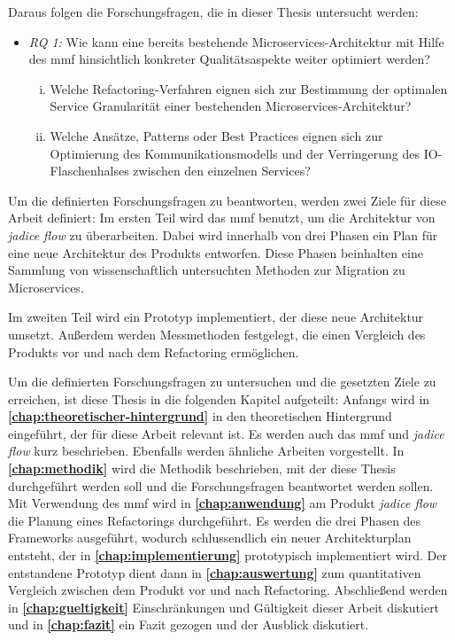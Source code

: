 Daraus folgen die Forschungsfragen, die in dieser Thesis untersucht werden:

\begin{itemize}
	\item \emph{RQ 1:} Wie kann eine bereits bestehende Microservices-Architektur mit Hilfe des \acrfull{mmf} hinsichtlich konkreter Qualitätsaspekte weiter optimiert werden?
	\begin{enumerate}[i.]
		\item Welche Refactoring-Verfahren eignen sich zur Bestimmung der optimalen Service Granularität einer bestehenden Microservices-Architektur?
		\item Welche Ansätze, Patterns oder Best Practices eignen sich zur Optimierung des Kommunikationsmodells und der Verringerung des IO-Flaschenhalses zwischen den einzelnen Services?
	\end{enumerate}
\end{itemize}

Um die definierten Forschungsfragen zu beantworten, werden zwei Ziele für diese Arbeit definiert:
Im ersten Teil wird das \gls{mmf} benutzt, um die Architektur von \emph{jadice flow} zu überarbeiten.
Dabei wird innerhalb von drei Phasen ein Plan für eine neue Architektur des Produkts entworfen.
Diese Phasen beinhalten eine Sammlung von wissenschaftlich untersuchten Methoden zur Migration zu Microservices.

Im zweiten Teil wird ein Prototyp implementiert, der diese neue Architektur umsetzt.
Außerdem werden Messmethoden festgelegt, die einen Vergleich des Produkts vor und nach dem Refactoring ermöglichen.

Um die definierten Forschungsfragen zu untersuchen und die gesetzten Ziele zu erreichen, ist diese Thesis in die folgenden Kapitel aufgeteilt:
Anfangs wird in \textbf{\cref{chap:theoretischer-hintergrund}} in den theoretischen Hintergrund eingeführt, der für diese Arbeit relevant ist. 
Es werden auch das \gls{mmf} und \emph{jadice flow} kurz beschrieben. 
Ebenfalls werden ähnliche Arbeiten vorgestellt.
In \textbf{\cref{chap:methodik}} wird die Methodik beschrieben, mit der diese Thesis durchgeführt werden soll und die Forschungsfragen beantwortet werden sollen.
Mit Verwendung des \gls{mmf} wird in \textbf{\cref{chap:anwendung}} am Produkt \emph{jadice flow} die Planung eines Refactorings durchgeführt. 
Es werden die drei Phasen des Frameworks ausgeführt, wodurch schlussendlich ein neuer Architekturplan entsteht, der in \textbf{\cref{chap:implementierung}} prototypisch implementiert wird.
Der entstandene Prototyp dient dann in \textbf{\cref{chap:auswertung}} zum quantitativen Vergleich zwischen dem Produkt vor und nach Refactoring.
Abschließend werden in \textbf{\cref{chap:gueltigkeit}} Einschränkungen und Gültigkeit dieser Arbeit diskutiert und in \textbf{\cref{chap:fazit}} ein Fazit gezogen und der Ausblick diskutiert.  